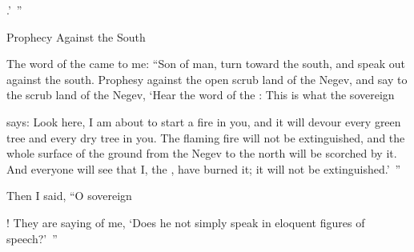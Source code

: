 {{}.’ ”
\par }{\SH Prophecy Against the South
\par }{\PP {} The word
of the {}
came to me:
“Son
of man,
turn
toward
the south,
and speak
out against the south.
Prophesy
against the open scrub land
of the Negev,
and say
to the scrub land
of the Negev,
‘Hear
the word
of the {}: This is what the sovereign

{}
says: Look
here, I am about to start a fire
in you,
and it will devour
every
green
tree
and every
dry
tree
in you. The flaming
fire
will not
be extinguished,
and the whole
surface
of the ground from the Negev
to the north
will be scorched by it.
And everyone
will see
that
I,
the {},
have burned
it; it will not
be extinguished.’ ”
\par }{\PP {}Then I said,
“O
sovereign

{}! They
are saying
of me, ‘Does he not
simply speak
in eloquent figures of speech?’ ”

}
